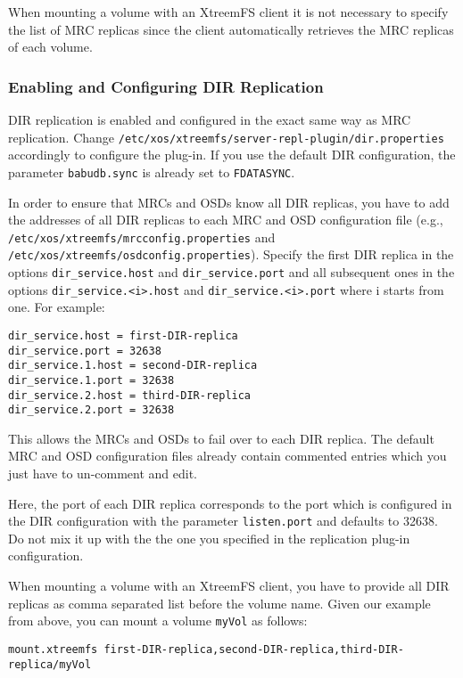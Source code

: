 \documentclass[a4paper,10pt]{book}
\begin{document}
When mounting a volume with an XtreemFS client it is not necessary to specify the list of MRC replicas since the client automatically retrieves the MRC replicas of each volume.

\subsubsection{Enabling and Configuring DIR Replication}
DIR replication is enabled and configured in the exact same way as MRC replication. Change \texttt{/etc/xos/xtreemfs/server-repl-plugin/dir.properties} accordingly to configure the plug-in. If you use the default DIR configuration, the parameter \texttt{babudb.sync} is already set to \texttt{FDATASYNC}.

In order to ensure that MRCs and OSDs know all DIR replicas, you have to add the addresses of all DIR replicas to each MRC and OSD configuration file (e.g.,  \texttt{/etc/xos/xtreemfs/mrcconfig.properties} and \texttt{/etc/xos/xtreemfs/osdconfig.properties}). Specify the first DIR replica in the options \texttt{dir\_service.host} and \texttt{dir\_service.port} and all subsequent ones in the options \texttt{dir\_service.<i>.host} and \texttt{dir\_service.<i>.port} where i starts from one. For example:

\begin{verbatim}
dir_service.host = first-DIR-replica
dir_service.port = 32638
dir_service.1.host = second-DIR-replica
dir_service.1.port = 32638
dir_service.2.host = third-DIR-replica
dir_service.2.port = 32638
\end{verbatim}

This allows the MRCs and OSDs to fail over to each DIR replica. The default MRC and OSD configuration files already contain commented entries which you just have to un-comment and edit.

Here, the port of each DIR replica corresponds to the port which is configured in the DIR configuration with the parameter \texttt{listen.port} and defaults to 32638. Do not mix it up with the the one you specified in the replication plug-in configuration.

When mounting a volume with an XtreemFS client, you have to provide all DIR replicas as comma separated list before the volume name. Given our example from above, you can mount a volume \texttt{myVol} as follows:

\begin{verbatim}
mount.xtreemfs first-DIR-replica,second-DIR-replica,third-DIR-replica/myVol
\end{verbatim}
\end{document}
